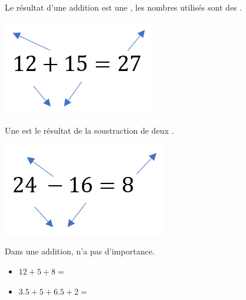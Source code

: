 	\begin{mydef}
	
		Le résultat d'une addition est une \hspace*{3cm}, les nombres utilisés sont des \hspace*{3cm}.
	\end{mydef}

	\begin{myex}
		\begin{center}
			\includegraphics*[scale=0.7]{img/somme2}
		\end{center}
	\end{myex}
		
	\begin{mydef}
			Une \hspace*{4cm} est le résultat de la soustraction de deux \hspace*{3cm}.
		
	\end{mydef}

	\begin{myex}
		\begin{center}
			\includegraphics*[scale=0.7]{img/difference2}
		\end{center}
	\end{myex}


	\begin{myprop}
		Dans une addition, \hspace*{6cm} n'a pas d'importance.
	\end{myprop}

	\begin{myex}
		\begin{itemize}
			\item $12 + 5 + 8 = $ %
			\item $\num{3.5} + 5 + \num{6.5} + 2 = $ %
		\end{itemize}
	\end{myex}

